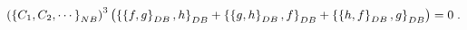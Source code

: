 \begin{equation}
\left(  \left\{  C_{1},C_{2},\cdots\right\}  _{{\footnotesize NB}}\right)
^{3}\left(  \left\{  \left\{  f,g\right\}  _{{\footnotesize DB}},h\right\}
_{{\footnotesize DB}}+\left\{  \left\{  g,h\right\}  _{{\footnotesize DB}%
},f\right\}  _{{\footnotesize DB}}+\left\{  \left\{  h,f\right\}
_{{\footnotesize DB}},g\right\}  _{{\footnotesize DB}}\right)  =0\;.
\end{equation}

